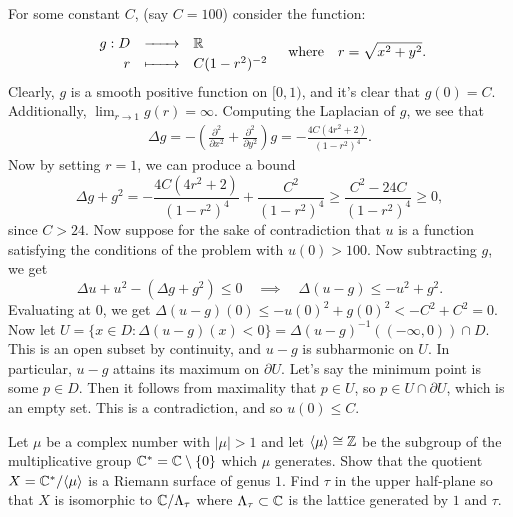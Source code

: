 \documentclass[expanded]{lkx_pset}
\begin{document}
\begin{solution}
	For some constant $C$, (say $C=100$) consider the function:
	\[
		\definefunction{g}{D}{\R}{r}{C(1-r^2)^{-2}}
		\quad\textrm{where}\quad r = \sqrt{x^2+y^2}.
	\]
	Clearly, $g$ is a smooth positive function on $[0,1)$, and it's clear that $g(0)=C$. Additionally, $\lim_{r\to 1} g(r) = \infty$. Computing the Laplacian of $g$, we see that
	\[
		\begin{aligned}
			\Delta g = -\left(\frac{\partial^2}{\partial x^2}+\frac{\partial^2}{\partial y^2}\right)g = -\frac{4C(4r^2+2)}{(1-r^2)^4}.
		\end{aligned}
	\]
	Now by setting $r=1$, we can produce a bound
	\[
		\Delta g + g^2 = -\frac{4C(4r^2+2)}{(1-r^2)^4} + \frac{C^2}{(1-r^2)^4}\geq \frac{C^2-24C}{(1-r^2)^4} \geq 0,
	\]
	since $C>24$. Now suppose for the sake of contradiction that $u$ is a function satisfying the conditions of the problem with $u(0)>100$. Now subtracting $g$, we get
	\[
		\Delta u + u^2 - (\Delta g + g^2) \leq 0\quad\implies\quad \Delta(u-g)\leq -u^2+g^2.
	\]
	Evaluating at $0$, we get $\Delta(u-g)(0)\leq -u(0)^2+g(0)^2 < -C^2 + C^2 = 0$. Now let $U=\{x\in D : \Delta(u-g)(x)<0\}=\Delta(u-g)^{-1}((-\infty,0))\cap D$. This is an open subset by continuity, and $u-g$ is subharmonic on $U$. In particular, $u-g$ attains its maximum on $\partial U$. Let's say the minimum point is some $p\in D$. Then it follows from maximality that $p\in U$, so $p\in U\cap \partial U$, which is an empty set. This is a contradiction, and so $u(0)\leq C$.
\end{solution}

\begin{problem}{3}
Let $\mu$ be a complex number with $|\mu|>1$ and let $\langle\mu \rangle\cong \mathbb{Z}$ be the subgroup of the multiplicative group $\mathbb{C}^* = \mathbb{C} \setminus \{0\}$ which $\mu$ generates. Show that the quotient $X = \mathbb{C}^*/\langle \mu\rangle$ is a Riemann surface of genus $1$. Find $\tau$ in the upper half-plane so that $X$ is isomorphic to $\mathbb{C}/\Lambda_\tau$ where $\Lambda_\tau\subset \mathbb{C}$ is the lattice generated by $1$ and $\tau$.
\end{problem}
\end{document}

